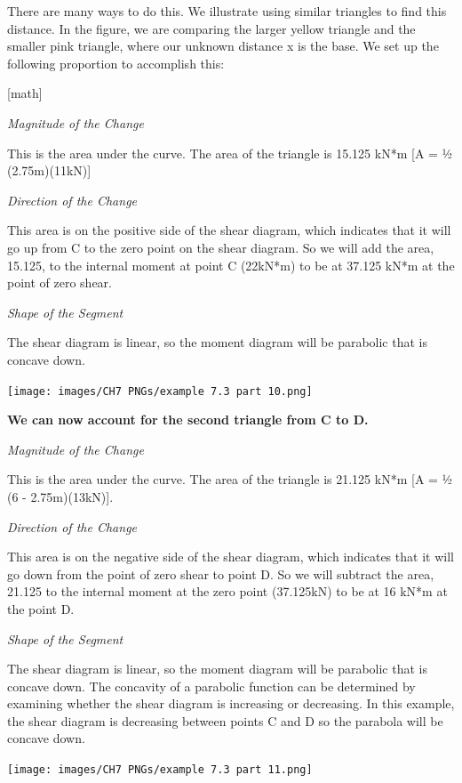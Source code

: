 \documentclass[
  letterpaper,
  DIV=11,
  numbers=noendperiod]{scrreprt}
\begin{document}
\begin{tcolorbox}
There are many ways to do this. We illustrate using similar triangles to
find this distance. In the figure, we are comparing the larger yellow
triangle and the smaller pink triangle, where our unknown distance x is
the base. We set up the following proportion to accomplish this:

{[}math{]}

\emph{Magnitude of the Change}

This is the area under the curve. The area of the triangle is 15.125
kN*m {[}A = ½ (2.75m)(11kN){]}

\emph{Direction of the Change}

This area is on the positive side of the shear diagram, which indicates
that it will go up from C to the zero point on the shear diagram. So we
will add the area, 15.125, to the internal moment at point C (22kN*m) to
be at 37.125 kN*m at the point of zero shear.

\emph{Shape of the Segment}

The shear diagram is linear, so the moment diagram will be parabolic
that is concave down.

\begin{center}
\texttt{[image: images/CH7 PNGs/example 7.3 part 10.png]}
\end{center}

\textbf{We can now account for the second triangle from C to D.}

\emph{Magnitude of the Change}

This is the area under the curve. The area of the triangle is 21.125
kN*m {[}A = ½ (6 - 2.75m)(13kN){]}.

\emph{Direction of the Change}

This area is on the negative side of the shear diagram, which indicates
that it will go down from the point of zero shear to point D. So we will
subtract the area, 21.125 to the internal moment at the zero point
(37.125kN) to be at 16 kN*m at the point D.

\emph{Shape of the Segment}

The shear diagram is linear, so the moment diagram will be parabolic
that is concave down. The concavity of a parabolic function can be
determined by examining whether the shear diagram is increasing or
decreasing. In this example, the shear diagram is decreasing between
points C and D so the parabola will be concave down.

\begin{center}
\texttt{[image: images/CH7 PNGs/example 7.3 part 11.png]}
\end{center}


\end{tcolorbox}
\end{document}
